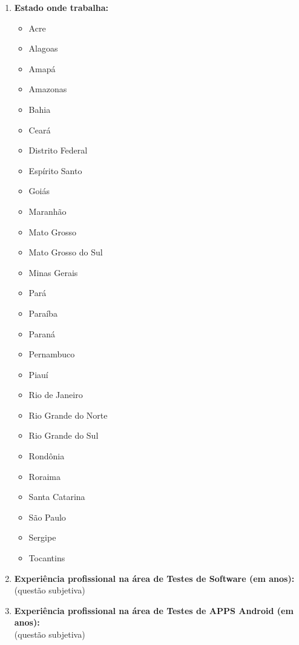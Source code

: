 \begin{enumerate}[label=\bf A\arabic*,leftmargin=1.8cm]
\begin{enumerate}[label= \arabic*]
        \item \textbf{Estado onde trabalha:}
        \begin{itemize}
            \item Acre
            \item Alagoas
            \item Amapá
            \item Amazonas
            \item Bahia
            \item Ceará
            \item Distrito Federal
            \item Espírito Santo
            \item Goiás
            \item Maranhão
            \item Mato Grosso
            \item Mato Grosso do Sul
            \item Minas Gerais
            \item Pará
            \item Paraíba
            \item Paraná
            \item Pernambuco
            \item Piauí
            \item Rio de Janeiro
            \item Rio Grande do Norte
            \item Rio Grande do Sul
            \item Rondônia
            \item Roraima
            \item Santa Catarina
            \item São Paulo
            \item Sergipe
            \item Tocantins 
        \end{itemize}
        
        
        \item \textbf{Experiência profissional na área de Testes de Software (em anos):}\\
        (questão subjetiva)
        
        \item \textbf{Experiência profissional na área de Testes de \ac{APPS} Android (em anos):}\\
        (questão subjetiva)
        

\end{enumerate}
\end{enumerate}
